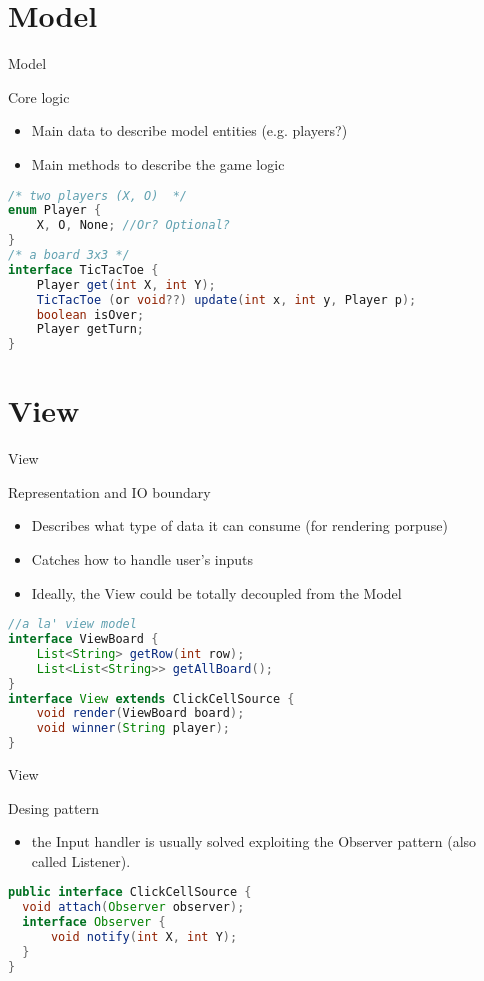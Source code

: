 \documentclass[presentation]{beamer}
\let\oldcite\cite
\renewcommand{\cite}[1]{{\color{blue}\oldcite{#1}}}
\begin{document}
\section{Model}
\begin{frame}[fragile]{Model}
\begin{block}{Core logic}
  \begin{itemize}
    \item Main data to describe model entities (e.g. players?)
    \item Main methods to describe the game logic
  \end{itemize}
\end{block}
\begin{lstlisting}[language=Java]
/* two players (X, O)  */
enum Player {
    X, O, None; //Or? Optional?
}
/* a board 3x3 */
interface TicTacToe {
    Player get(int X, int Y);
    TicTacToe (or void??) update(int x, int y, Player p);
    boolean isOver;
    Player getTurn;
}
\end{lstlisting}
\end{frame}
\section{View}
\begin{frame}[fragile]{View}
\begin{block}{Representation and IO boundary}
  \begin{itemize}
    \item Describes what type of data it can consume (for rendering porpuse)
    \item Catches how to handle user's inputs
    \item Ideally, the View could be totally decoupled from the Model
  \end{itemize}
\end{block}
\begin{lstlisting}[language=Java]
//a la' view model
interface ViewBoard {
    List<String> getRow(int row);
    List<List<String>> getAllBoard();
}
interface View extends ClickCellSource {
    void render(ViewBoard board);
    void winner(String player);
}
\end{lstlisting}
\end{frame}
\begin{frame}[fragile]{View}
\begin{block}{Desing pattern}
  \begin{itemize}
    \item the Input handler is usually solved exploiting the Observer \cite{gamma1995design} pattern (also called Listener). 
  \end{itemize}
\end{block}
\begin{lstlisting}[language=Java]
public interface ClickCellSource {
  void attach(Observer observer);
  interface Observer {
      void notify(int X, int Y);
  }
}
\end{lstlisting}
\end{frame}
\end{document}
